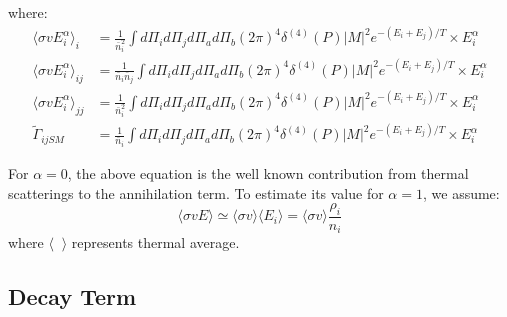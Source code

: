 \documentclass[preprint,notoc]{JHEP3}
\begin{document}
where:
\begin{eqnarray}
\langle \sigma v E_i^\alpha \rangle_i & =  \frac{1}{\bar{n}_i^2}\int  d\Pi_{i} d\Pi_{j} d\Pi_{a} d\Pi_{b} (2 \pi)^4 \delta^{(4)}(P) |M|^2 e^{-(E_i + E_j)/T} \times E_i^{\alpha} \\
\langle \sigma v E_i^\alpha \rangle_{ij} & =  \frac{1}{\bar{n}_i \bar{n}_j}\int  d\Pi_{i} d\Pi_{j} d\Pi_{a} d\Pi_{b} (2 \pi)^4 \delta^{(4)}(P) |M|^2 e^{-(E_i + E_j)/T} \times E_i^{\alpha} \\
\langle \sigma v E_i^\alpha \rangle_{jj} & =  \frac{1}{\bar{n}_i^2}\int  d\Pi_{i} d\Pi_{j} d\Pi_{a} d\Pi_{b} (2 \pi)^4 \delta^{(4)}(P) |M|^2 e^{-(E_i + E_j)/T} \times E_i^{\alpha} \\
\tilde{\Gamma}_{ijSM} & =  \frac{1}{\bar{n}_i}\int  d\Pi_{i} d\Pi_{j} d\Pi_{a} d\Pi_{b} (2 \pi)^4 \delta^{(4)}(P) |M|^2 e^{-(E_i + E_j)/T} \times E_i^{\alpha} 
\end{eqnarray}

For $\alpha = 0$, the above equation is the well known contribution from thermal scatterings to the annihilation term. To estimate its value for $\alpha = 1$, we assume:
\begin{equation}
\langle \sigma v E \rangle \simeq \langle \sigma v \rangle \langle E_i \rangle = \langle \sigma v \rangle \frac{\rho_i}{n_i} \label{eq:app}
\end{equation}
where $\langle \;\; \rangle$ represents thermal average.


\subsection{Decay Term}
\end{document}
